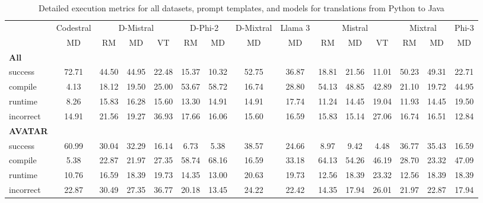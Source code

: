 \begin{table}[t]
\caption{Detailed execution metrics for all datasets, prompt templates, and models for translations from Python to Java}
\label{tab:iteration_1_stats_percent_Python_Java}

\setlength{\tabcolsep}{2.5pt} %
\renewcommand{\arraystretch}{1} %

\footnotesize
\begin{tabular}{@{}lcccccccccccccc@{}}
\toprule
 & Codestral & \multicolumn{3}{c}{D-Mistral} & \multicolumn{2}{c}{D-Phi-2} & D-Mixtral & Llama 3 & \multicolumn{3}{c}{Mistral}  & \multicolumn{2}{c}{Mixtral} & Phi-3 \\ 

\cmidrule(l){2-2}
\cmidrule(l){3-5}
\cmidrule(l){6-7}
\cmidrule(l){8-8}
\cmidrule(l){9-9}
\cmidrule(l){10-12}
\cmidrule(l){13-14}
\cmidrule(l){15-15}

& \multicolumn{1}{c}{MD}
& \multicolumn{1}{c}{RM}
& \multicolumn{1}{c}{MD}
& \multicolumn{1}{c}{VT}
& \multicolumn{1}{c}{RM}
& \multicolumn{1}{c}{MD} 
& \multicolumn{1}{c}{MD} 
& \multicolumn{1}{c}{MD} 
& \multicolumn{1}{c}{RM} 
& \multicolumn{1}{c}{MD} 
& \multicolumn{1}{c}{VT} 
& \multicolumn{1}{c}{RM}
& \multicolumn{1}{c}{MD} 
& \multicolumn{1}{c}{MD} \\

\midrule
\textbf{All} & & & & & & & & & & & & & & \\ 
\quad success & 72.71 & 44.50 & 44.95 & 22.48 & 15.37 & 10.32 & 52.75 & 36.87 & 18.81 & 21.56 & 11.01 & 50.23 & 49.31 & 22.71 \\
\qquad compile & 4.13 & 18.12 & 19.50 & 25.00 & 53.67 & 58.72 & 16.74 & 28.80 & 54.13 & 48.85 & 42.89 & 21.10 & 19.72 & 44.95 \\
\qquad runtime & 8.26 & 15.83 & 16.28 & 15.60 & 13.30 & 14.91 & 14.91 & 17.74 & 11.24 & 14.45 & 19.04 & 11.93 & 14.45 & 19.50 \\
\qquad incorrect & 14.91 & 21.56 & 19.27 & 36.93 & 17.66 & 16.06 & 15.60 & 16.59 & 15.83 & 15.14 & 27.06 & 16.74 & 16.51 & 12.84 \\
 

\textbf{AVATAR} & & & & & & & & & & & & & & \\
\quad success & 60.99 & 30.04 & 32.29 & 16.14 & 6.73 & 5.38 & 38.57 & 24.66 & 8.97 & 9.42 & 4.48 & 36.77 & 35.43 & 16.59 \\
\qquad compile & 5.38 & 22.87 & 21.97 & 27.35 & 58.74 & 68.16 & 16.59 & 33.18 & 64.13 & 54.26 & 46.19 & 28.70 & 23.32 & 47.09 \\
\qquad runtime & 10.76 & 16.59 & 18.39 & 19.73 & 14.35 & 13.00 & 20.63 & 19.73 & 12.56 & 18.39 & 23.32 & 12.56 & 18.39 & 18.39 \\
\qquad incorrect & 22.87 & 30.49 & 27.35 & 36.77 & 20.18 & 13.45 & 24.22 & 22.42 & 14.35 & 17.94 & 26.01 & 21.97 & 22.87 & 17.94 \\
 


\end{tabular}
\end{table}
